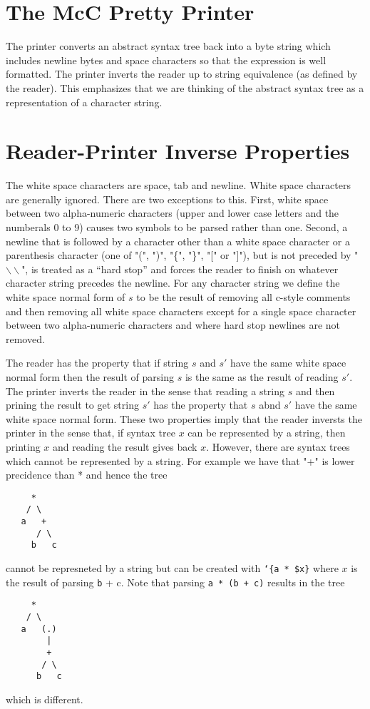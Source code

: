 \documentclass{article}
\newcommand{\mtt}[1]{\mbox{\tt #1}}
\begin{document}
\section{The McC Pretty Printer}

The printer converts an abstract syntax tree back into a byte string which includes newline bytes and space characters
so that the expression is well formatted. The printer inverts the reader up to string equivalence (as defined by the reader).
This emphasizes that we are thinking of the abstract syntax tree as a representation of a character string.

\section{Reader-Printer Inverse Properties}

The white space characters are space, tab and newline.  White space characters are generally ignored.  There are two exceptions to this.
First, white space between two alpha-numeric characters (upper and lower case letters and the numberals 0 to 9) causes two symbols to be parsed rather than one.
Second, a newline that is followed by a character other than a white space character or a parenthesis character (one of "(", ")", "\{", "\}", "[" or "]"), but is not preceded by "$\backslash\backslash$", is
treated as a ``hard stop''
and forces the reader to finish on whatever character string precedes the newline.
For any character string we define the white space normal form of $s$
to be the result of removing all c-style comments and then removing all white space characters except for
a single space character between two alpha-numeric characters and where hard stop newlines
are not removed.

The reader has the property that if string $s$ and $s'$ have the same white space normal form then the result of parsing
$s$ is the same as the result of reading $s'$.  The printer inverts the reader
in the sense that reading a string $s$ and then prining the result to get string $s'$ has the property that $s$ abnd $s'$ have the same white space normal form.
These two properties imply that the reader inversts the printer in the sense that, if syntax tree $x$ can be represented by a string, then printing $x$ and reading the result gives back $x$.
However, there are syntax trees which cannot be represented by a string.  For example we have that "+" is lower precidence than * and hence the tree
\begin{verbatim}
     *
    / \
   a   +
      / \
     b   c
\end{verbatim}
cannot be represneted by a string but can be created with {\tt `\{a * \$x\}} where $x$ is the result of parsing {\mtt b + c}.
Note that parsing {\tt a * (b + c)} results in the tree
\begin{verbatim}
     *
    / \
   a   (.)
        |
        +
       / \
      b   c
\end{verbatim}
which is different.
\end{document}

